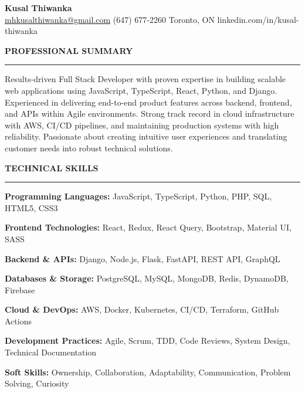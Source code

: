 \documentclass[10pt,letterpaper]{article}
\begin{document}
\begin{center}
{\LARGE\textbf{Kusal Thiwanka}}\\[3pt]
\href{mailto:mhkusalthiwanka@gmail.com}{mhkusalthiwanka@gmail.com}\hspace{2em}%
(647) 677{-}2260\hspace{2em}%
Toronto, ON\hspace{2em}
linkedin.com/in/kusal-thiwanka
\end{center}

\vspace{6pt}

\textbf{PROFESSIONAL SUMMARY}\\[-8pt]
\noindent\rule{\textwidth}{1pt}

\vspace{-2pt}

Results-driven Full Stack Developer with proven expertise in building scalable web applications using JavaScript, TypeScript, React, Python, and Django. Experienced in delivering end-to-end product features across backend, frontend, and APIs within Agile environments. Strong track record in cloud infrastructure with AWS, CI/CD pipelines, and maintaining production systems with high reliability. Passionate about creating intuitive user experiences and translating customer needs into robust technical solutions.

\vspace{8pt}

\textbf{TECHNICAL SKILLS}\\[-8pt]
\noindent\rule{\textwidth}{1pt}

\vspace{-2pt}

\textbf{Programming Languages:} JavaScript, TypeScript, Python, PHP, SQL, HTML5, CSS3

\textbf{Frontend Technologies:} React, Redux, React Query, Bootstrap, Material UI, SASS

\textbf{Backend \& APIs:} Django, Node.js, Flask, FastAPI, REST API, GraphQL

\textbf{Databases \& Storage:} PostgreSQL, MySQL, MongoDB, Redis, DynamoDB, Firebase

\textbf{Cloud \& DevOps:} AWS, Docker, Kubernetes, CI/CD, Terraform, GitHub Actions

\textbf{Development Practices:} Agile, Scrum, TDD, Code Reviews, System Design, Technical Documentation

\textbf{Soft Skills:} Ownership, Collaboration, Adaptability, Communication, Problem Solving, Curiosity
\end{document}
